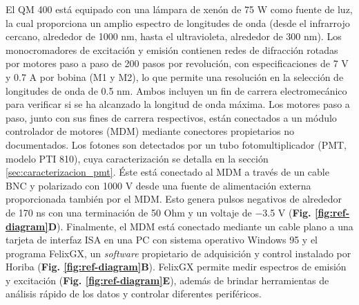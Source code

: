 El QM 400 está equipado con una lámpara de xenón de 75 W como fuente de luz, la cual proporciona un amplio espectro de longitudes de onda (desde el infrarrojo cercano, alrededor de 1000 nm, hasta el ultravioleta, alrededor de 300 nm).
Los monocromadores de excitación y emisión contienen redes de difracción rotadas por motores paso a paso de 200 pasos por revolución, con especificaciones de 7 V y 0.7 A por bobina (M1 y M2), lo que permite una resolución en la selección de longitudes de onda de 0.5 nm. 
Ambos incluyen un fin de carrera electromecánico para verificar si se ha alcanzado la longitud de onda máxima.
Los motores paso a paso, junto con sus fines de carrera respectivos, están conectados a un módulo controlador de motores (MDM) mediante conectores propietarios no documentados. 
Los fotones son detectados por un tubo fotomultiplicador (PMT, modelo PTI 810), cuya caracterización se detalla en la sección \ref{sec:caracterizacion_pmt}.
Éste está conectado al MDM a través de un cable BNC y polarizado con 1000 V desde una fuente de alimentación externa proporcionada también por el MDM. 
Esto genera pulsos negativos de alrededor de 170 ns con una terminación de 50 Ohm y un voltaje de −3.5 V (\textbf{Fig. \ref{fig:ref-diagram}D}). 
Finalmente, el MDM está conectado mediante un cable plano a una tarjeta de interfaz ISA en una PC con sistema operativo Windows 95 y el programa FelixGX, un \textit{software} propietario de adquisición y control instalado por Horiba (\textbf{Fig. \ref{fig:ref-diagram}B}).
FelixGX permite medir espectros de emisión y excitación (\textbf{Fig. \ref{fig:ref-diagram}E}), además de brindar herramientas de análisis rápido de los datos y controlar diferentes periféricos.

